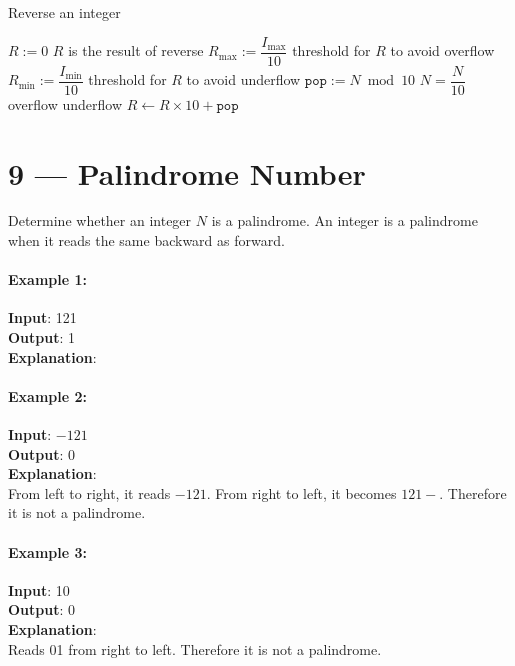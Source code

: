 \setcounter{algorithm}{0}
\begin{algorithm}[H]
\caption{Reverse an integer}
\begin{algorithmic}[1]
\Statex
{}
\State $R:=0$ \Comment $R$ is the result of reverse
\State $R_{\max}:= \dfrac{I_{\max}}{10}$ \Comment threshold for $R$ to avoid overflow
\State $R_{\min}:= \dfrac{I_{\min}}{10}$ \Comment threshold for $R$ to avoid underflow
\State $\mathtt{pop} := N \bmod 10$
\State $N = \dfrac{N}{10}$
 \Comment overflow
\State {}
 \Comment underflow
\State {}
\Else
\State $R\gets R\times 10 + \mathtt{pop}$
\EndIf
\EndWhile
\EndProcedure
\Statex
\end{algorithmic}
\end{algorithm}

\section{9 --- Palindrome Number}
Determine whether an integer $N$ is a palindrome. An integer is a palindrome when it reads the same backward as forward.
\paragraph{Example 1:}
\begin{flushleft}
\textbf{Input}: 121
\\
\textbf{Output}: 1
\\
\textbf{Explanation}:
\end{flushleft}
\paragraph{Example 2:}
\begin{flushleft}
\textbf{Input}: $-121$
\\
\textbf{Output}: 0
\\
\textbf{Explanation}:
\\
From left to right, it reads $-121$. From right to left, it becomes $121-$. Therefore it is not a palindrome.
\end{flushleft}
\paragraph{Example 3:}
\begin{flushleft}
\textbf{Input}: 10
\\
\textbf{Output}: 0
\\
\textbf{Explanation}:
\\
Reads 01 from right to left. Therefore it is not a palindrome.
\end{flushleft}
